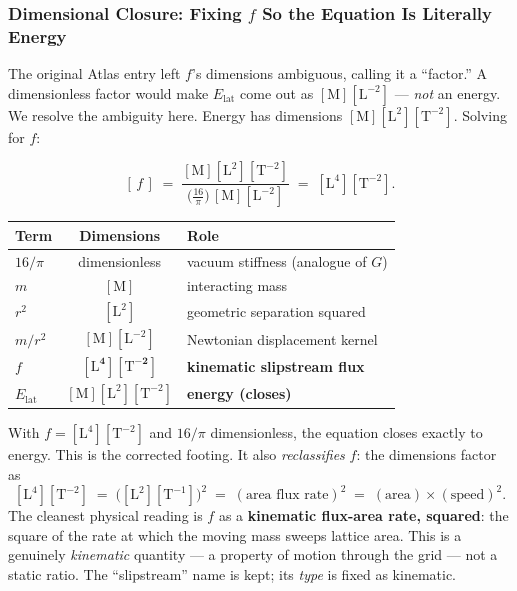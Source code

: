 \documentclass[12pt,oneside]{book}
\begin{document}
\subsubsection{Dimensional Closure: Fixing $f$ So the Equation Is Literally Energy}
 
The original Atlas entry left $f$'s dimensions ambiguous, calling it a ``factor.'' A
dimensionless factor would make $E_{\mathrm{lat}}$ come out as
$[\mathrm{M}][\mathrm{L}^{-2}]$ --- \emph{not} an energy. We resolve the ambiguity here.
Energy has dimensions $[\mathrm{M}][\mathrm{L}^{2}][\mathrm{T}^{-2}]$. Solving for $f$:
 
\[
[\,f\,] \;=\; \frac{[\mathrm{M}][\mathrm{L}^{2}][\mathrm{T}^{-2}]}
{\big(\tfrac{16}{\pi}\big)\,[\mathrm{M}][\mathrm{L}^{-2}]}
\;=\; [\mathrm{L}^{4}][\mathrm{T}^{-2}].
\]
 
\begin{center}
\setlength{\arrayrulewidth}{0.3mm}
\begin{tabular}{|l|c|l|}
\hline
\rowcolor{kishblue!12}
\textbf{Term} & \textbf{Dimensions} & \textbf{Role} \\
\hline
$16/\pi$ & dimensionless & vacuum stiffness (analogue of $G$) \\
$m$ & $[\mathrm{M}]$ & interacting mass \\
$r^{2}$ & $[\mathrm{L}^{2}]$ & geometric separation squared \\
$m/r^{2}$ & $[\mathrm{M}][\mathrm{L}^{-2}]$ & Newtonian displacement kernel \\
$f$ & $\mathbf{[\mathrm{L}^{4}][\mathrm{T}^{-2}]}$ & \textbf{kinematic slipstream flux} \\
\hline
\rowcolor{empiricaltag!15}
$E_{\mathrm{lat}}$ & $[\mathrm{M}][\mathrm{L}^{2}][\mathrm{T}^{-2}]$ & \textbf{energy (closes)} \\
\hline
\end{tabular}
\end{center}
 
With $f = [\mathrm{L}^{4}][\mathrm{T}^{-2}]$ and $16/\pi$ dimensionless, the equation
closes exactly to energy. This is the corrected footing. It also \emph{reclassifies}
$f$: the dimensions factor as
\[
[\mathrm{L}^{4}][\mathrm{T}^{-2}] \;=\; \big([\mathrm{L}^{2}][\mathrm{T}^{-1}]\big)^{2}
\;=\; (\text{area flux rate})^{2}
\;=\; (\text{area}) \times (\text{speed})^{2}.
\]
The cleanest physical reading is $f$ as a \textbf{kinematic flux-area rate, squared}:
the square of the rate at which the moving mass sweeps lattice area. This is a genuinely
\emph{kinematic} quantity --- a property of motion through the grid --- not a static
ratio. The ``slipstream'' name is kept; its \emph{type} is fixed as kinematic.
 
\end{document}
